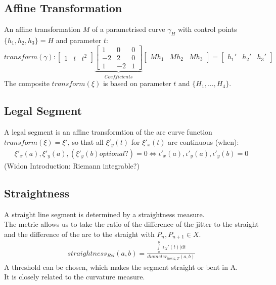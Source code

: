 \documentclass{report}
\begin{document}
\subsection{Affine Transformation}
An affine transformation $M$ of a parametrised curve $\gamma_{H}$ with control points $\{h_{1},h_{2},h_{3}\} = H$ and parameter $t$:
\begin{equation}
transform(\gamma):
\begin{bmatrix}
1 & t & t^2
\end{bmatrix}
\underbrace{\begin{bmatrix}
1 & 0 & 0\\
-2 & 2 & 0\\
1 & -2 &1
\end{bmatrix}}_{Coefficients}
\begin{bmatrix}
Mh_{1} & Mh_{2} & Mh_{3}
\end{bmatrix}
=
\begin{bmatrix}
h_{1}' & h_{2}' & h_{3}'
\end{bmatrix}
\end{equation}
The composite $transform(\xi)$ is based on parameter $t$ and $\{H_{1}, ... ,H_{4}\}$.

\subsection{Legal Segment}
A legal segment is an affine transformtion of the arc curve function $transform(\xi) = \xi'$, so that all $\xi'_{y}(t)$ for $\xi'_{x}(t)$ are continuous (when):
\begin{align}
\xi'_{x}(a),\xi'_{y}(a), (\xi'_{y}(b)optional?) = 0 \Leftrightarrow \iota'_{x}(a),\iota'_{y}(a), \iota'_{y}(b) = 0
\end{align}
(Widon Introduction: Riemann integrable?)

\subsection{Straightness}
A straight line segment is determined by a straightness measure.\\
The metric allows us to take the ratio of the difference of the jitter to the straight and the difference of the arc to the straight with $P_{n},P_{n+1} \in X$. \\
\begin{align}
straightness_{Rel}(a,b)=\frac{\int \limits _{a}^{b} \lvert \iota_{X}'(t) \rvert \mathrm{d}t}{diameter_{horiz,T}(a,b)}
\end{align}
A threshold can be chosen, which makes the segment straight or bent in A.\\
It is closely related to the curvature measure.
\end{document}
